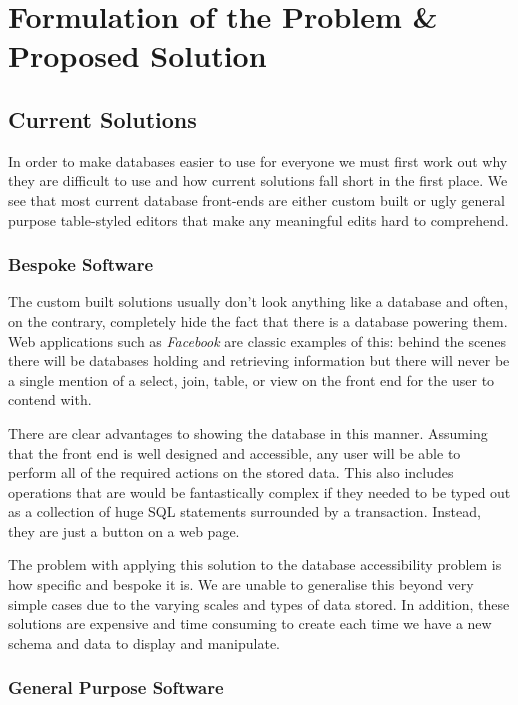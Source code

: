 \chapter{Formulation of the Problem \& Proposed Solution}

\section{Current Solutions}

In order to make databases easier to use for everyone we must first work out
why they are difficult to use and how current solutions fall short in the first
place. We see that most current database front-ends are either custom built or
ugly general purpose table-styled editors that make any meaningful edits hard
to comprehend.

\subsection{Bespoke Software}

The custom built solutions usually don't look anything like a database and
often, on the contrary, completely hide the fact that there is a database
powering them. Web applications such as \emph{Facebook} are classic examples of
this: behind the scenes there will be databases holding and retrieving
information but there will never be a single mention of a select, join, table,
or view on the front end for the user to contend with.

There are clear advantages to showing the database in this manner. Assuming
that the front end is well designed and accessible, any user will be able to
perform all of the required actions on the stored data. This also includes
operations that are would be fantastically complex if they needed to be typed
out as a collection of huge \ac{SQL} statements surrounded by a transaction.
Instead, they are just a button on a web page.

The problem with applying this solution to the database accessibility problem
is how specific and bespoke it is. We are unable to generalise this beyond very
simple cases due to the varying scales and types of data stored. In addition,
these solutions are expensive and time consuming to create each time we have
a new schema and data to display and manipulate.

\subsection{General Purpose Software}

